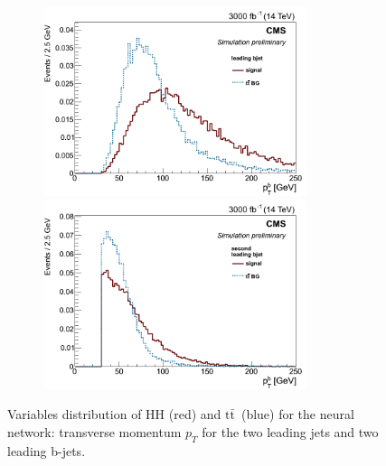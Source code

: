 \documentclass[10pt,a4paper]{article}
\newcommand{\ww}{7.7cm} %
\newcommand{\dd}{-2mm} %
\renewcommand{\tt}{\ensuremath{\text{t}\bar{\text{t}}}}
\begin{document}
\begin{figure}[h]
  \begin{subfigure}[b]{17cm}
    \begin{minipage}[h!]{\ww}
      \centering
      \includegraphics[width=\ww]{figs/bjet1Pt.png}
    \end{minipage}
    \begin{minipage}[h!]{\ww}
      \centering
      \includegraphics[width=\ww]{figs/bjet2Pt.png}
    \end{minipage}
  \end{subfigure}	
  \vspace{\dd}
  \caption{Variables distribution of HH (red) and \tt\ (blue) for the neural network: transverse momentum $p_T$ for the two leading jets and two leading b-jets.} \label{vars2}

\end{figure}
\end{document}
